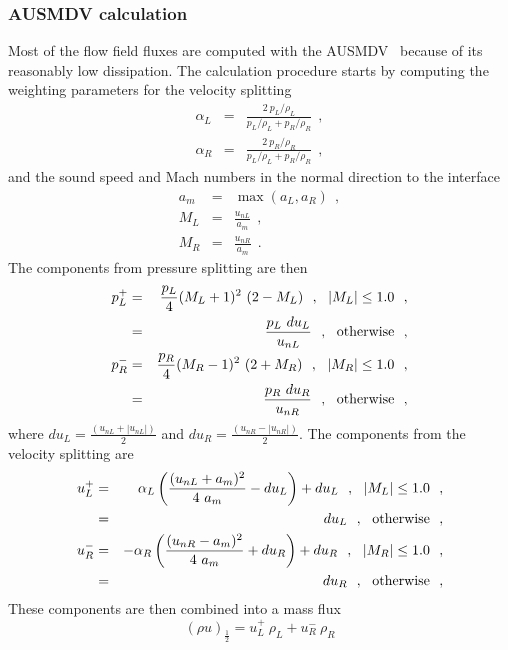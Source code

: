 \subsubsection{AUSMDV calculation}
%
\newcommand{\ruhalf}{(\rho u)_\frac{1}{2}}
\newcommand{\rusq}{(\rho u^2)}
%
Most of the flow field fluxes are computed with the AUSMDV~\cite{wada_liou_94a} 
because of its reasonably low dissipation.
The calculation procedure starts by computing the weighting parameters for the velocity splitting
\begin{eqnarray}
  \alpha_L & = & \frac{2 ~ p_L / \rho_L}{p_L / \rho_L + p_R / \rho_R} ~~, \nonumber \\
  \alpha_R & = & \frac{2 ~ p_R / \rho_R}{p_L / \rho_L + p_R / \rho_R} ~~, 
\end{eqnarray}
and the sound speed and Mach numbers in the normal direction to the interface
\begin{eqnarray}
  a_m & = & \max(a_L, a_R) ~~, \nonumber \\
  M_L & = & \frac{u_{nL}}{a_m} ~~, \nonumber \\
  M_R & = & \frac{u_{nR}}{a_m} ~~.
\end{eqnarray}
The components from pressure splitting are then
\begin{eqnarray}
 p_L^+ & = & \frac{p_L}{4} ( M_L + 1 )^2 ~(2 - M_L) ~~, ~~ |M_L| \le 1.0 ~~, \nonumber \\
       & = & \frac{p_L ~ du_L}{u_{nL}} ~~, ~~ {\rm otherwise} ~~, \nonumber \\  
 p_R^- & = & \frac{p_R}{4} ( M_R - 1 )^2 ~(2 + M_R) ~~, ~~ |M_R| \le 1.0 ~~, \nonumber \\
       & = & \frac{p_R ~ du_R}{u_{nR}} ~~, ~~ {\rm otherwise} ~~,  
\end{eqnarray}
where $du_L = \frac{( u_{nL} + |u_{nL}|)}{2} $ and $du_R = \frac{(u_{nR} - |u_{nR}|)}{2}$.
The components from the velocity splitting are
\begin{eqnarray}
 u_L^+ & = & \alpha_L \left( \frac{( u_{nL} + a_m )^2}{4 ~ a_m} - du_L \right) + du_L  ~~, ~~ |M_L| \le 1.0 ~~, \nonumber \\
       & = & du_L ~~, ~~ {\rm otherwise} ~~, \nonumber \\  
 u_R^- & = & - \alpha_R \left( \frac{( u_{nR} - a_m )^2}{4 ~ a_m} + du_R \right) + du_R  ~~, ~~ |M_R| \le 1.0 ~~, \nonumber \\
       & = & du_R ~~, ~~ {\rm otherwise} ~~,  
\end{eqnarray}
These components are then combined into a mass flux
\begin{equation}
 \ruhalf = u_L^+ ~ \rho_L + u_R^- ~ \rho_R
\end{equation}
